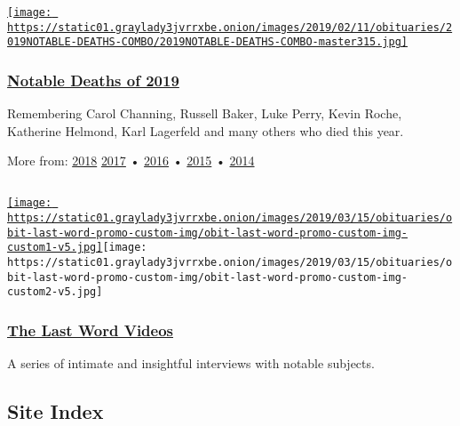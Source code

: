 \href{https://www.nytimes3xbfgragh.onion/interactive/2019/obituaries/notable-deaths.html}{\texttt{[image: https://static01.graylady3jvrrxbe.onion/images/2019/02/11/obituaries/2019NOTABLE-DEATHS-COMBO/2019NOTABLE-DEATHS-COMBO-master315.jpg]}}

\hypertarget{notable-deaths-of-2019}{%
\subsubsection{\texorpdfstring{\href{https://www.nytimes3xbfgragh.onion/interactive/2019/obituaries/notable-deaths.html}{Notable
Deaths of 2019}}{Notable Deaths of 2019}}\label{notable-deaths-of-2019}}

Remembering Carol Channing, Russell Baker, Luke Perry, Kevin Roche,
Katherine Helmond, Karl Lagerfeld and many others who died this year.

More from:
\href{https://www.nytimes3xbfgragh.onion/interactive/2018/obituaries/notable-deaths.html}{2018}
\href{https://www.nytimes3xbfgragh.onion/interactive/projects/notable-deaths/2017}{2017}
•
\href{https://www.nytimes3xbfgragh.onion/interactive/projects/notable-deaths/2016}{2016}
•
\href{https://www.nytimes3xbfgragh.onion/interactive/2015/obituaries/notable-deaths-2015.html}{2015}
•
\href{https://www.nytimes3xbfgragh.onion/interactive/2014/obituaries/notable-deaths-2014.html}{2014}

\subsection{}

\href{https://www.nytimes3xbfgragh.onion/video/last-word}{\texttt{[image: https://static01.graylady3jvrrxbe.onion/images/2019/03/15/obituaries/obit-last-word-promo-custom-img/obit-last-word-promo-custom-img-custom1-v5.jpg]}}\texttt{[image: https://static01.graylady3jvrrxbe.onion/images/2019/03/15/obituaries/obit-last-word-promo-custom-img/obit-last-word-promo-custom-img-custom2-v5.jpg]}

\hypertarget{the-last-word-videos}{%
\subsubsection{\texorpdfstring{\href{https://www.nytimes3xbfgragh.onion/video/last-word}{The
Last Word Videos}}{The Last Word Videos}}\label{the-last-word-videos}}

A series of intimate and insightful interviews with notable subjects.

\hypertarget{site-index}{%
\subsection{Site Index}\label{site-index}}

